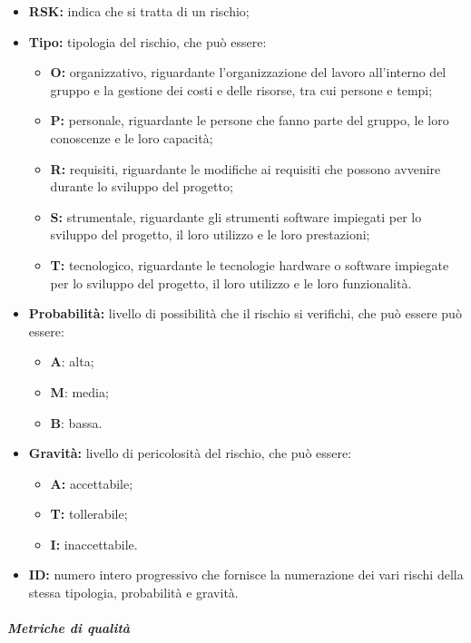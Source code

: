 			\begin{itemize}
				\item \textbf{RSK:} indica che si tratta di un rischio;
				\item \textbf{Tipo:} tipologia del rischio, che può essere:
				\begin{itemize}
					\item \textbf{O:} organizzativo, riguardante l'organizzazione del lavoro all'interno del gruppo e la gestione dei costi e delle risorse, tra cui persone e tempi;
					\item \textbf{P:} personale, riguardante le persone che fanno parte del gruppo, le loro conoscenze e le loro capacità;
					\item \textbf{R:} requisiti, riguardante le modifiche ai requisiti che possono avvenire durante lo sviluppo del progetto;
					\item \textbf{S:} strumentale, riguardante gli strumenti software impiegati per lo sviluppo del progetto, il loro utilizzo e le loro prestazioni;
					\item \textbf{T:} tecnologico, riguardante le tecnologie hardware o software impiegate per lo sviluppo del progetto, il loro utilizzo e le loro funzionalità.
				\end{itemize}
				\item \textbf{Probabilità:} livello di possibilità che il rischio si verifichi, che può essere può essere:
				\begin{itemize}
					\item \textbf{A}: alta;
					\item \textbf{M}: media;
					\item \textbf{B}: bassa.
				\end{itemize}
				\item \textbf{Gravità:} livello di pericolosità del rischio, che può essere:
				\begin{itemize}
					\item \textbf{A:} accettabile;
					\item \textbf{T:} tollerabile;
					\item \textbf{I:} inaccettabile.
				\end{itemize}
				\item \textbf{ID:} numero intero progressivo che fornisce la numerazione dei vari rischi della stessa tipologia, probabilità e gravità.

			\end{itemize}

			\subparagraph{Metriche di qualità}


